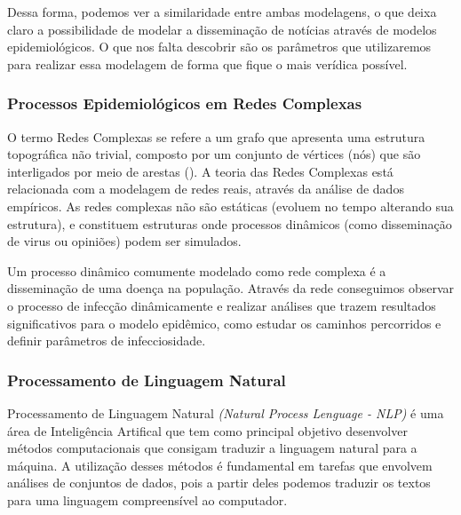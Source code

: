 \documentclass[a4paper,12pt]{article}
\begin{document}
Dessa forma, podemos ver a similaridade entre ambas modelagens, o que deixa claro a possibilidade de modelar a disseminação de
notícias através de modelos epidemiológicos. O que nos falta descobrir são os parâmetros que utilizaremos para realizar essa modelagem
de forma que fique o mais verídica possível.

\subsubsection{Processos Epidemiológicos em Redes Complexas}

 O termo Redes Complexas se refere a um grafo que apresenta uma estrutura topográfica não trivial, composto por um conjunto
 de vértices (nós) que são interligados por meio de arestas (\cite{ravasz2003hierarchical}). A teoria das Redes Complexas  
 está relacionada com a modelagem de redes reais, através da 
 análise de dados empíricos. As redes complexas não são estáticas (evoluem no tempo alterando sua estrutura), e 
 constituem estruturas onde processos dinâmicos (como disseminação de virus ou opiniões) podem ser simulados.
 
 Um processo dinâmico comumente modelado como rede complexa é a disseminação de uma doença na população. Através da rede
 conseguimos observar o processo de infecção dinâmicamente e realizar análises que trazem resultados significativos para o modelo epidêmico,
 como estudar os caminhos percorridos e definir parâmetros de infecciosidade.
 
 
\subsubsection{Processamento de Linguagem Natural}
\label{sec:nlp}

Processamento de Linguagem Natural \textit{(Natural Process Lenguage - NLP)} é uma área de Inteligência Artifical que tem como principal
objetivo desenvolver métodos computacionais que consigam traduzir a linguagem natural para a máquina. A utilização desses
métodos é fundamental em tarefas que envolvem análises de conjuntos de dados, pois a partir deles podemos
traduzir os textos para uma linguagem compreensível ao computador.
\end{document}
